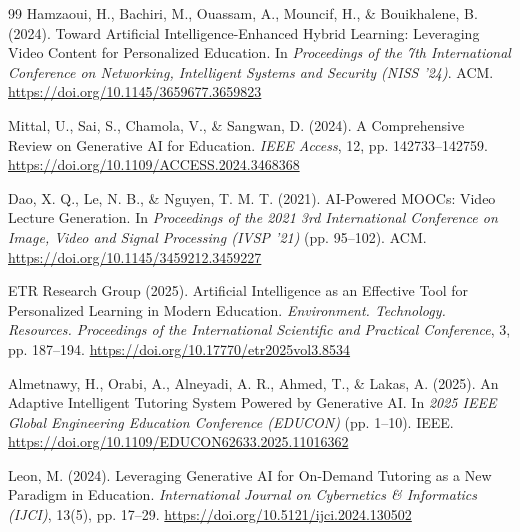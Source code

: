 \documentclass[final,5p,times,twocolumn,authoryear]{elsarticle}
\begin{document}
\begin{thebibliography}{99}
Hamzaoui, H., Bachiri, M., Ouassam, A., Mouncif, H., \& Bouikhalene, B. (2024). Toward Artificial Intelligence-Enhanced Hybrid Learning: Leveraging Video Content for Personalized Education. In \textit{Proceedings of the 7th International Conference on Networking, Intelligent Systems and Security (NISS '24)}. ACM. \url{https://doi.org/10.1145/3659677.3659823}

Mittal, U., Sai, S., Chamola, V., \& Sangwan, D. (2024). A Comprehensive Review on Generative AI for Education. \textit{IEEE Access}, 12, pp. 142733--142759. \url{https://doi.org/10.1109/ACCESS.2024.3468368}

Dao, X. Q., Le, N. B., \& Nguyen, T. M. T. (2021). AI-Powered MOOCs: Video Lecture Generation. In \textit{Proceedings of the 2021 3rd International Conference on Image, Video and Signal Processing (IVSP '21)} (pp. 95--102). ACM. \url{https://doi.org/10.1145/3459212.3459227}

ETR Research Group (2025). Artificial Intelligence as an Effective Tool for Personalized Learning in Modern Education. \textit{Environment. Technology. Resources. Proceedings of the International Scientific and Practical Conference}, 3, pp. 187--194. \url{https://doi.org/10.17770/etr2025vol3.8534}

Almetnawy, H., Orabi, A., Alneyadi, A. R., Ahmed, T., \& Lakas, A. (2025). An Adaptive Intelligent Tutoring System Powered by Generative AI. In \textit{2025 IEEE Global Engineering Education Conference (EDUCON)} (pp. 1--10). IEEE. \url{https://doi.org/10.1109/EDUCON62633.2025.11016362}

Leon, M. (2024). Leveraging Generative AI for On-Demand Tutoring as a New Paradigm in Education. \textit{International Journal on Cybernetics \& Informatics (IJCI)}, 13(5), pp. 17--29. \url{https://doi.org/10.5121/ijci.2024.130502}

\end{thebibliography}
\end{document}
